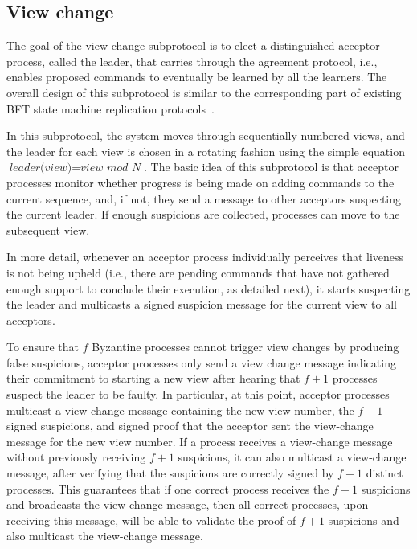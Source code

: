\subsection{View change} 

The goal of the view change subprotocol is to elect a distinguished acceptor process, called the leader, that carries through the agreement protocol, i.e., enables proposed commands to eventually be learned by all the learners. The overall design of this subprotocol is similar to the corresponding part of existing BFT state machine replication protocols~\cite{CL99}.

In this subprotocol, the system moves through sequentially numbered views, and the leader for each view is chosen in a rotating fashion using the simple equation $\textit{leader(view)}=\textit{view mod N}$. The basic idea of this subprotocol is that acceptor processes monitor whether progress is being made on adding commands to the current sequence, and, if not, they send a message to other acceptors suspecting the current leader. If enough suspicions are collected, processes can move to the subsequent view.

In more detail, whenever an acceptor process individually perceives that liveness is not being upheld (i.e., there are pending commands that have not gathered enough support to conclude their execution, as detailed next), it starts suspecting the leader and multicasts a signed {\sc suspicion} message for the current view to all acceptors.

To ensure that $f$ Byzantine processes cannot trigger view changes by producing  false suspicions, acceptor processes only send a view change message indicating their commitment to starting a new view after hearing that $f+1$ processes suspect the leader to be faulty. In particular, at this point, acceptor processes multicast a view-change message containing the new view number, the $f+1$ signed suspicions, and signed proof that the acceptor sent the view-change message for the new view number. If a process receives a view-change message without previously receiving $f+1$ suspicions, it can also multicast a view-change message, after verifying that the suspicions are correctly signed by $f+1$ distinct processes.
This guarantees that if one correct process receives the $f+1$ suspicions and broadcasts the view-change message, then all correct processes, upon receiving this message, will be able to validate the proof of $f+1$ suspicions and also multicast the view-change message.


